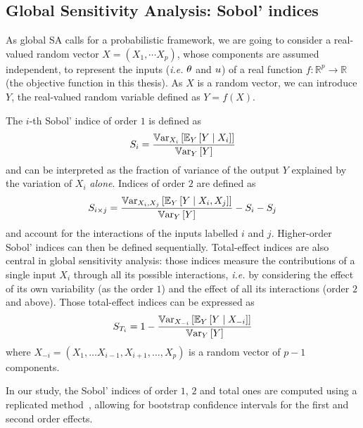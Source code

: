 \documentclass[../../Main_ManuscritThese.tex]{subfiles}
\begin{document}
\subsection{Global Sensitivity Analysis: Sobol' indices}
\label{sec:sobol-indices}
As global SA calls for a probabilistic framework, we are going to
consider a real-valued random vector $X=(X_1,\cdots X_p)$, whose
components are assumed independent, to represent the inputs (\emph{i.e.}
$\theta$ and $u$) of a real function
$f: \mathbb{R}^p\rightarrow \mathbb{R}$ (the objective function in this
thesis). As $X$ is a random vector, we can introduce $Y$, the
real-valued random variable defined as $Y=f(X)$.

The $i$-th Sobol' indice of order $1$ is defined
as~\citep{sobol_sensitivity_1993,sobol_global_2001}
\begin{equation}
  S_i = \frac{\mathbb{V}\mathrm{ar}_{X_i}\left[\mathbb{E}_{Y}\left[Y \mid X_i\right]\right]}{\mathbb{V}\mathrm{ar}_{Y}\left[Y\right]}
\end{equation}
and can be interpreted as the fraction of variance of the output
$Y$ explained by the variation of $X_i$ \emph{alone}. Indices of
order $2$ are defined as
\begin{equation}
  S_{i\times j} = \frac{\mathbb{V}\mathrm{ar}_{X_i, X_j}\left[\mathbb{E}_{Y}\left[Y \mid X_i, X_j\right]\right]}{\mathbb{V}\mathrm{ar}_{Y}\left[Y\right]} - S_i -S_j
\end{equation}
and account for the interactions of the inputs labelled $i$ and $j$.
Higher-order Sobol' indices can then be defined
sequentially. Total-effect indices are also central in global
sensitivity analysis: those indices measure the contributions of a
single input $X_i$ through all its possible interactions,
\textit{i.e.} by considering the effect of its own variability (as the
order $1$) and the effect of all its interactions (order $2$ and
above). Those total-effect indices can be expressed as
\begin{equation}
  S_{T_i} = 1 - \frac{\mathbb{V}\mathrm{ar}_{X_{-i}}\left[\mathbb{E}_{Y}\left[Y \mid X_{-i}\right]\right]}{\mathbb{V}\mathrm{ar}_{Y}\left[Y\right]}
\end{equation}
where $X_{-i} = (X_1,\dots X_{i-1},X_{i+1},\dots,X_p)$ is a random vector of $p-1$ components.

In our study, the Sobol' indices of order $1$, $2$ and total ones are
computed using a replicated
method~\citep{gilquin_making_2019,gilquin_echantillonnages_2016},
allowing for bootstrap confidence intervals for the first and second
order effects.
\end{document}
